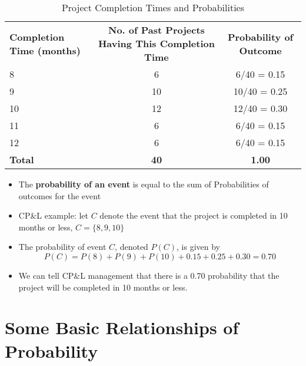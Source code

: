\documentclass{report}
\begin{document}
\begin{table}[h!]
\hspace{-9mm}\begin{tabular}{lcc}
\textbf{Completion Time (months)} & \textbf{No. of Past Projects Having This Completion Time} & \textbf{Probability of Outcome} \\[0.5em]
8 & 6 & 6/40 = 0.15 \\[0.5em]
9 & 10 & 10/40 = 0.25 \\[0.5em]
10 & 12 & 12/40 = 0.30 \\[0.5em]
11 & 6 & 6/40 = 0.15 \\[0.5em]
12 & 6 & 6/40 = 0.15 \\[0.5em]
\textbf{Total} & \textbf{40} & \textbf{1.00} \\[0.5em]
\end{tabular}
\caption{Project Completion Times and Probabilities}
\label{table:project_completion}
\end{table}
\begin{itemize}
  \item The \textbf{probability of an event} is equal to the sum of Probabilities of outcomes for the event
  \item CP\&L example: let $C$ denote the event that the project is completed in 10 months or less, $C = \{8, 9, 10\}$
  \item The probability of event $C$, denoted $P(C)$, is given by
    $$ P(C) = P(8) + P(9) + P(10) + 0.15 + 0.25 + 0.30 = 0.70$$
  \item We can tell CP\&L management that there is a 0.70 probability that the project will be completed in 10 months or less.
\end{itemize}
\section{Some Basic Relationships of Probability}
\end{document}
